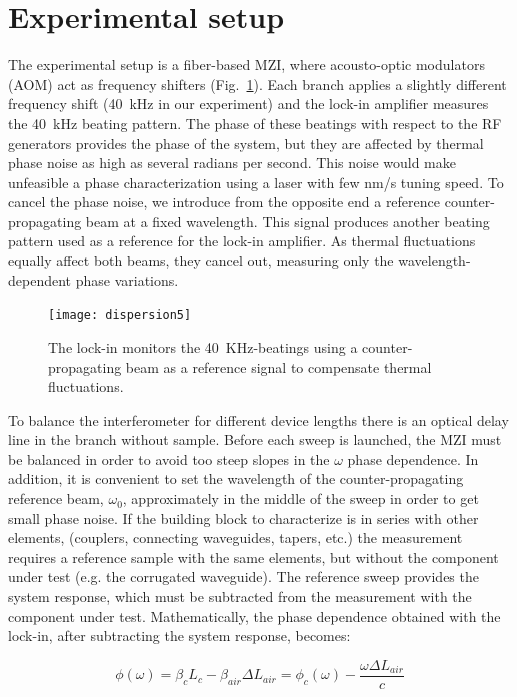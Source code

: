 \documentclass[journal]{IEEEtran}
\begin{document}
\section{Experimental setup}
The experimental setup is a fiber-based MZI, where acousto-optic modulators (AOM) act as frequency shifters (Fig.~\ref{fig:dispersionSetup}).
Each branch applies a slightly different frequency shift (40~kHz in our experiment) and the lock-in amplifier measures the 40~kHz beating pattern.
The phase of these beatings with respect to the RF generators provides the phase of the system, but they are affected by thermal phase noise as high as several radians per second. 
This noise would make unfeasible a phase characterization using a laser with few nm/s tuning speed.
To cancel the phase noise, we introduce from the opposite end a reference counter-propagating beam at a fixed wavelength.
This signal produces another beating pattern used as a reference for the lock-in amplifier.
As thermal fluctuations equally affect both beams, they cancel out, measuring only the wavelength-dependent phase variations.



\begin{figure}[htb]
	\centering
	\texttt{[image: dispersion5]}
	\caption{The lock-in monitors the 40~KHz-beatings using a counter-propagating beam as a reference signal to compensate thermal fluctuations.}
	\label{fig:dispersionSetup}
\end{figure}



To balance the interferometer for different device lengths there is an optical delay line in the branch without sample.
Before each sweep is launched, the MZI must be balanced in order to avoid too steep slopes in the $\omega$ phase dependence.
In addition, it is convenient to set the wavelength of the counter-propagating reference beam, $\omega_0$, approximately in the middle of the sweep in order to get small phase noise.
If the building block to characterize is in series with other elements, (couplers, connecting waveguides, tapers, etc.) the measurement requires a reference sample with the same elements, but without the component under test (e.g. the corrugated waveguide).
The reference sweep provides the system response, which must be subtracted from the measurement with the component under test. 
Mathematically, the phase dependence obtained with the lock-in, after subtracting the system response, becomes:


\begin{equation}
  \phi(\omega)= \beta_c L_c - \beta_{air} \Delta L_{air} =\phi_{c}(\omega)-\frac{\omega\Delta L_{air}}{c}
  \label{eq:response}
\end{equation}
\end{document}
